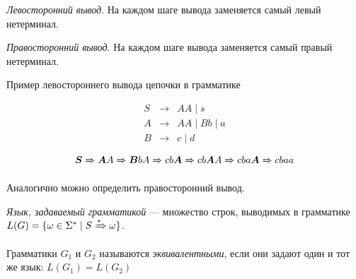 \begin{definition}
\textit{Левосторонний вывод}. На каждом шаге вывода заменяется самый левый нетерминал.
\end{definition}

\begin{definition}
  \textit{Правосторонний вывод}. На каждом шаге вывода заменяется самый правый нетерминал.
\end{definition}


\begin{example}
Пример левостороннего вывода цепочки в грамматике

  \[
    \begin{array}{rcl}
    S& \rightarrow & A A \mid s  \\
    A& \rightarrow & A A \mid B b \mid a \\
    B& \rightarrow & c \mid d
    \end{array}
  \]

  \[ \boldsymbol{S} \xRightarrow[]{} \boldsymbol{A} A \xRightarrow[]{} \boldsymbol{B} b A \xRightarrow[]{} c b \boldsymbol{A} \xRightarrow[]{} c b \boldsymbol{A} A \xRightarrow[]{} c b a \boldsymbol{A} \xRightarrow[]{} c b a a \]
\end{example}

Аналогично можно определить правосторонний вывод.

\begin{definition}
\textit{Язык, задаваемый грамматикой} --- множество строк, выводимых в грамматике $L(G) = \{ \omega \in \Sigma^* \mid S \xRightarrow[]{*} \omega \}$.
\end{definition}

\begin{definition}
  Грамматики $G_1$ и $G_2$ называются \textit{эквивалентными}, если они задают один и тот же язык: $L(G_1) = L(G_2)$
\end{definition}


